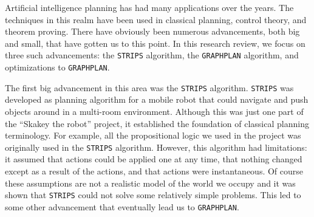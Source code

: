 \documentclass{article}
\newcommand{\GRAPHPLAN}{\texttt{GRAPHPLAN}}
\newcommand{\STRIPS}{\texttt{STRIPS}}
\begin{document}
Artificial intelligence planning has had many applications over the years. The techniques in this realm have been used in classical planning, control theory, and theorem proving.\cite{AMIA} There have obviously been numerous advancements, both big and small, that have gotten us to this point. In this research review, we focus on three such advancements: the \STRIPS{} algorithm, the \GRAPHPLAN{} algorithm, and optimizations to \GRAPHPLAN{}.

The first big advancement in this area was the \STRIPS{} algorithm. \STRIPS{} was developed as planning algorithm for a mobile robot that could navigate and push objects around in a multi-room environment\cite{StripsRevisit}. Although this was just one part of the ``Skakey the robot'' project, it established the foundation of classical planning terminology. For example, all the propositional logic we used in the project was originally used in the \STRIPS{} algorithm\cite{Weld1999}. However, this algorithm had limitations: it assumed that actions could be applied one at any time, that nothing changed except as a result of the actions, and that actions were instantaneous\cite{StripsRevisit}. Of course these assumptions are not a realistic model of the world we occupy and it was shown that \STRIPS{} could not solve some relatively simple problems\cite{AMIA}. This led to some other advancement that eventually lead us to \GRAPHPLAN{}.



{}

\end{document}
